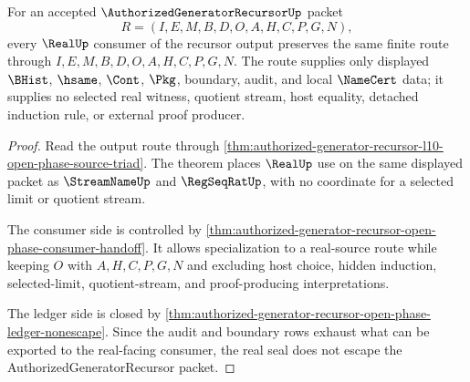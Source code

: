 \begin{theorem}
\label{thm:authorized-generator-recursor-real-seal-route-nonescape}
For an accepted $\AuthorizedGeneratorRecursorUp$ packet
$$
R=(I,E,M,B,D,O,A,H,C,P,G,N),
$$
every $\RealUp$ consumer of the recursor output preserves the same finite route through $I,E,M,B,D,O,A,H,C,P,G,N$. The route supplies only displayed $\BHist$, $\hsame$, $\Cont$, $\Pkg$, boundary, audit, and local $\NameCert$ data; it supplies no selected real witness, quotient stream, host equality, detached induction rule, or external proof producer.
\end{theorem}
\begin{proof}
Read the output route through \autoref{thm:authorized-generator-recursor-l10-open-phase-source-triad}. The theorem places $\RealUp$ use on the same displayed packet as $\StreamNameUp$ and $\RegSeqRatUp$, with no coordinate for a selected limit or quotient stream.

The consumer side is controlled by \autoref{thm:authorized-generator-recursor-open-phase-consumer-handoff}. It allows specialization to a real-source route while keeping $O$ with $A,H,C,P,G,N$ and excluding host choice, hidden induction, selected-limit, quotient-stream, and proof-producing interpretations.

The ledger side is closed by \autoref{thm:authorized-generator-recursor-open-phase-ledger-nonescape}. Since the audit and boundary rows exhaust what can be exported to the real-facing consumer, the real seal does not escape the AuthorizedGeneratorRecursor packet.
\end{proof}

